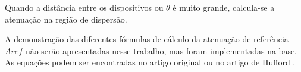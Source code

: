 Quando a distância entre os dispositivos ou $\theta$ é muito grande, calcula-se a atenuação na região de dispersão.

A demonstração das diferentes fórmulas de cálculo da atenuação de referência $A{ref}$ não serão apresentadas nesse trabalho, mas foram implementadas na base. As equações podem ser encontradas no artigo original \cite{longleyrice} ou no artigo de Hufford \cite{rufford}.

%
%
%
%
%
%
%
%
%
%
